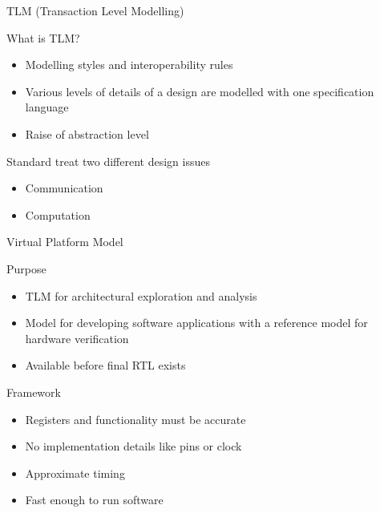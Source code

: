 \begin{frame}{TLM (Transaction Level Modelling)}
\begin{block}{What is TLM?}
	\begin{itemize}
		\item Modelling styles and interoperability rules
  		\item Various levels of details of a design are modelled with one specification language
		\item Raise of abstraction level
	\end{itemize}
\end{block}
\begin{block}{Standard treat two different design issues}
	\begin{itemize}
		\item Communication
		\item Computation
	\end{itemize}	
\end{block}
\end{frame}
\begin{frame}{Virtual Platform Model}
\begin{block}{Purpose}
	\begin{itemize}
		\item TLM for architectural exploration and analysis
		\item Model for developing software applications with a reference model for hardware verification
		\item Available before final RTL exists
\end{itemize}
\end{block}
\begin{block}{Framework}
	\begin{itemize}
		\item Registers and functionality must be accurate
		\item No implementation details like pins or clock
		\item Approximate timing
		\item Fast enough to run software
	\end{itemize}
\end{block}
\end{frame}
